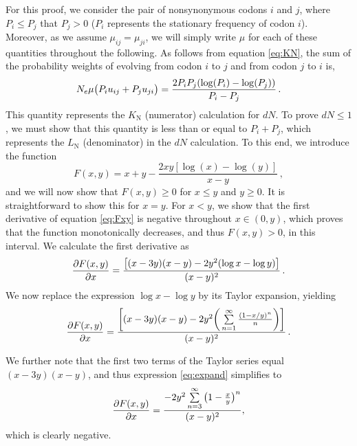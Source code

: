 \documentclass{pnastwo}
\begin{document}
\begin{article}
For this proof, we consider the pair of nonsynonymous codons $i$ and $j$, where $P_i \leq P_j$ that $P_j > 0$ ($P_i$ represents the stationary frequency of codon $i$). Moreover, as we assume $\mu_{ij} = \mu_{ji}$, we will simply write $\mu$ for each of these quantities throughout the following. As follows from equation \eqref{eq:KN}, the sum of the probability weights of evolving from codon $i$ to $j$ and from codon $j$ to $i$ is,
\begin{equation}
N_e\mu \big{(} P_iu_{ij} + P_ju_{ji} \big{)} = \frac{2P_iP_j(\log(P_i) - \log(P_j))}{P_i - P_j} \,.
\end{equation}
This quantity represents the $K_\text{N}$ (numerator) calculation for $dN$. To prove $dN \leq 1$, we must show that this quantity is less than or equal to $P_i + P_j$, which represents the $L_\text{N}$ (denominator) in the $dN$ calculation. To this end, we introduce the function 
\begin{equation}\label{eq:Fxy}
F(x,y) = x + y - \frac{2xy[\log(x) - \log(y)]}{x - y} \,,
\end{equation}
and we will now show that $F(x,y) \geq 0$ for $x \leq y$ and $y \geq 0 $. It is straightforward to show this for $x=y$. For $x < y$, we show that the first derivative of equation \eqref{eq:Fxy} is negative throughout $x \in (0,y)$, which proves that the function monotonically decreases, and thus $F(x,y) > 0$, in this interval. We calculate the first derivative as 
\begin{equation}
\frac{\partial{F(x,y)}}{\partial{x}} = \frac{\big{[} (x-3y)(x-y) - 2y^2(\log{x} - \log{y}) \big{]}}{(x-y)^2} \,.
\end{equation}
We now replace the expression $\log{x} - \log{y}$ by its Taylor expansion, yielding
\begin{equation}\label{eq:expand}
	\frac{\partial{F(x,y)}}{\partial{x}} = \frac{\bigg{[} (x-3y)(x-y) - 2y^2\bigg{(}\sum\limits_{n=1}^\infty \frac{(1-x/y)^n}{n}\bigg{)} \bigg{]}}{(x-y)^2} \,.
\end{equation}

We further note that the first two terms of the Taylor series equal $(x-3y)(x-y)$, and thus expression \eqref{eq:expand} simplifies to 
\begin{equation}
\frac{\partial{F(x,y)}}{\partial{x}} = \frac{-2y^2\sum\limits_{n=3}^\infty \big{(}1-\frac{x}{y}\big{)}^n}{(x-y)^2} ,
\end{equation}
which is clearly negative. 


\bigskip




\end{article}
\end{document}
